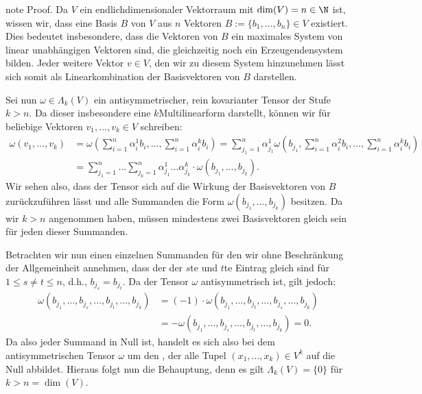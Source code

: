 \documentclass[letterpaper,10pt,english]{jupyterBook}
\begin{document}
\begin{sphinxadmonition}{note}
\sphinxAtStartPar
Proof. Da \(V\) ein endlich\sphinxhyphen{}dimensionaler Vektorraum mit \(\operatorname{dim}(V)=n \in \N\) ist, wissen wir, dass eine Basis \(B\) von \(V\) aus \(n\) Vektoren \(B := \lbrace b_1,\ldots,b_n \rbrace \in V\) existiert.
Dies bedeutet insbesondere, dass die Vektoren von \(B\) ein maximales System von linear unabhängigen Vektoren sind, die gleichzeitig noch ein Erzeugendensystem bilden.
Jeder weitere Vektor \(v \in V\), den wir zu diesem System hinzunehmen lässt sich somit als Linearkombination der Basisvektoren von \(B\) darstellen.

\sphinxAtStartPar
Sei nun \(\omega \in \Lambda_k(V)\) ein antisymmetrischer, rein kovarianter Tensor der Stufe \(k > n\).
Da dieser insbesondere eine \(k\)\sphinxhyphen{}Multilinearform darstellt, können wir für beliebige Vektoren \(v_1, \ldots, v_k \in V\) schreiben:
\begin{equation}\label{equation:vektoranalysis/tensor:eq:antisymmetrischerTensor}
\begin{split}\omega(v_1, \ldots, v_k) &= \omega(\sum_{i=1}^n \alpha_i^1 b_i, \ldots, \sum_{i=1}^n \alpha_i^k b_i) = \sum_{j_1=1}^n \alpha_{j_1}^1 \omega(b_{j_1}, \sum_{i=1}^n \alpha_i^2 b_i, \ldots, \sum_{i=1}^n \alpha_i^k b_i) \\
&= \sum_{j_1=1}^n \ldots \sum_{j_k=1}^n \alpha_{j_1}^1 \ldots \alpha_{j_k}^k \cdot \omega(b_{j_1}, \ldots, b_{j_k}).\end{split}
\end{equation}
\sphinxAtStartPar
Wir sehen also, dass der Tensor sich auf die Wirkung der Basisvektoren von \(B\) zurückzuführen lässt und alle Summanden die Form \(\omega(b_{j_1}, \ldots, b_{j_k})\) besitzen.
Da wir \(k > n\) angenommen haben, müssen mindestens zwei Basisvektoren gleich sein für jeden dieser Summanden.

\sphinxAtStartPar
Betrachten wir nun einen einzelnen Summanden für den wir ohne Beschränkung der Allgemeinheit annehmen, dass der der \(s\)\sphinxhyphen{}te und \(t\)\sphinxhyphen{}te Eintrag gleich sind für \(1 \leq s \neq t \leq n\), d.h., \(b_{j_s}=b_{j_t}\).
Da der Tensor \(\omega\) antisymmetrisch ist, gilt jedoch:
\begin{equation*}
\begin{split}\omega(b_{j_1}, \ldots, b_{j_s}, \ldots, b_{j_t}, \ldots, b_{j_k}) &= (-1) \cdot \omega(b_{j_1}, \ldots, b_{j_t}, \ldots, b_{j_s}, \ldots, b_{j_k}) \\
&= - \omega(b_{j_1}, \ldots, b_{j_s}, \ldots, b_{j_t}, \ldots, b_{j_k}) = 0.\end{split}
\end{equation*}
\sphinxAtStartPar
Da also jeder Summand in {\hyperref[\detokenize{vektoranalysis/tensor:equation-eq-antisymmetrischertensor}]{}} Null ist, handelt es sich also bei dem antisymmetrischen Tensor \(\omega\) um den , der alle Tupel \((x_1, \ldots, x_k) \in V^k\) auf die Null abbildet.
Hieraus folgt nun die Behauptung, denn es gilt \(\Lambda_k(V) = \lbrace 0 \rbrace\) für \(k > n =\operatorname{dim}(V)\).
\end{sphinxadmonition}
\end{document}
